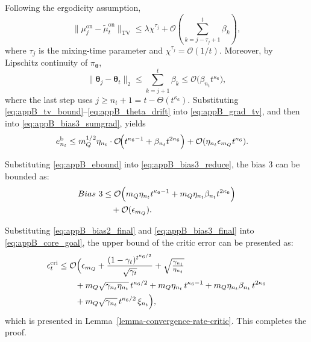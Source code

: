 \documentclass{IEEEtran}
\begin{document}
Following the ergodicity assumption, 
\begin{equation}
\|\mu_j^{\mathrm{on}}-\tilde\mu_t^{\mathrm{on}}\|_{\mathrm{TV}}
\le \lambda\chi^{\tau_j}
+\mathcal{O}\!\left(\sum_{k=j-\tau_j+1}^{t}\beta_k\right),
\label{eq:appB_tv_bound}
\end{equation}
where $\tau_j$ is the mixing-time parameter and $\chi^{\tau_j}=\mathcal{O}(1/t)$. Moreover, by Lipschitz continuity of $\pi_{\boldsymbol{\theta}}$,
\begin{equation}
\|\boldsymbol{\theta}_j-\boldsymbol{\theta}_t\|_2
\le \sum_{k=j+1}^{t}\beta_k
\le \mathcal{O}\!\bigl(\beta_{n_t}t^{\kappa_6}\bigr),
\label{eq:appB_theta_drift}
\end{equation}
where the last step uses $j\ge n_t+1=t-\Theta(t^{\kappa_6})$. Substituting \eqref{eq:appB_tv_bound}--\eqref{eq:appB_theta_drift} into \eqref{eq:appB_grad_tv}, and then into \eqref{eq:appB_bias3_sumgrad}, yields
\begin{equation}
\begin{aligned}
e_{n_t}^{\mathrm{b}}
&\le m_Q^{1/2}\eta_{n_t}\cdot\mathcal{O}\!\Bigl(
t^{\kappa_6-1}+\beta_{n_t}t^{2\kappa_6}
\Bigr)
+\mathcal{O}(\eta_{n_t}\epsilon_{m_Q}t^{\kappa_6}).
\end{aligned}
\label{eq:appB_ebound}
\end{equation}

Substituting \eqref{eq:appB_ebound} into \eqref{eq:appB_bias3_reduce}, the bias 3 can be bounded as: 
\begin{equation}
\begin{aligned}
Bias~3
&\le \mathcal{O}\Bigl(
m_Q\eta_{n_t}t^{\kappa_6-1}
+m_Q\eta_{n_t}\beta_{n_t}t^{2\kappa_6}
\Bigr)\\
&\quad+\mathcal{O}(\epsilon_{m_Q}).
\end{aligned}
\label{eq:appB_bias3_final}
\end{equation}

Substituting \eqref{eq:appB_bias2_final} and \eqref{eq:appB_bias3_final} into \eqref{eq:appB_core_goal}, the upper bound of the critic error can be presented as: 
\begin{equation}
\begin{aligned}
\epsilon_{t}^{\mathrm{cri}}
&\le \mathcal{O}\Bigl(
\epsilon_{m_Q}
+\frac{(1-\gamma_{t})^{t^{\kappa_{6}/2}}}{\sqrt{\gamma_{t}}}
+\sqrt{\tfrac{\gamma_{n_{t}}}{\eta_{n_{t}}}}\\
&\qquad
+m_Q\sqrt{\gamma_{n_{t}}\eta_{n_{t}}}\,t^{\kappa_{6}/2}
+m_Q\eta_{n_{t}}\,t^{\kappa_{6}-1}
+m_Q\eta_{n_{t}}\beta_{n_{t}}\,t^{2\kappa_{6}}\\
&\qquad
+m_Q\sqrt{\gamma_{n_t}}\,t^{\kappa_6/2}\,\xi_{n_t}
\Bigr),
\end{aligned}
\end{equation}
which is presented in Lemma~\ref{lemma-convergence-rate-critic}. This completes the proof.  
\end{document}
